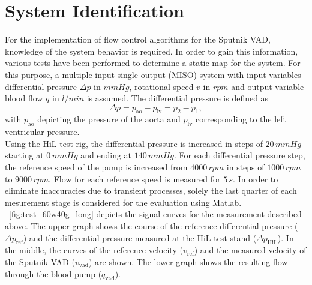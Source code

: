 \section{System Identification}
For the implementation of flow control algorithms for the Sputnik VAD, knowledge of the system behavior is required. In order to gain this information, various tests have been performed to determine a static map for the system. For this purpose, a multiple-input-single-output (MISO) system with input variables differential pressure $\Delta{p}$ in $mmHg$, rotational speed $v$ in $rpm$ and output variable blood flow $q$ in $l/min$ is assumed. The differential pressure is defined as
\begin{equation}
  \Delta{p} = p_{\mathrm{ao}} - p_{\mathrm{lv}} = p_{\mathrm{2}} - p_{\mathrm{1}},
\end{equation}
with $p_{\mathrm{ao}}$ depicting the pressure of the aorta and $p_{\mathrm{lv}}$ corresponding to the left ventricular pressure.
\\Using the HiL test rig, the differential pressure is increased in steps of $20\, mmHg$ starting at $0\,mmHg$ and ending at $140\,mmHg$. For each differential pressure step, the reference speed of the pump is increased from $4000\, rpm$ in steps of $1000\, rpm$ to $9000\, rpm$. Flow for each reference speed is measured for $5\, s$. In order to eliminate inaccuracies due to transient processes, solely the last quarter of each mesurement stage is considered for the evaluation using Matlab. \figurename~\ref{fig:test_60w40g_long} depicts the signal curves for the measurement described above. The upper graph shows the course of the reference differential pressure ($\Delta{p_{\mathrm{ref}}}$) and the differential pressure measured at the HiL test stand ($\Delta{p_{\mathrm{HiL}}}$).
In the middle, the curves of the reference velocity ($v_{\mathrm{ref}}$) and the measured velocity of the Sputnik VAD ($v_{\mathrm{vad}}$) are shown. The lower graph shows the resulting flow through the blood pump ($q_{\mathrm{vad}}$).


